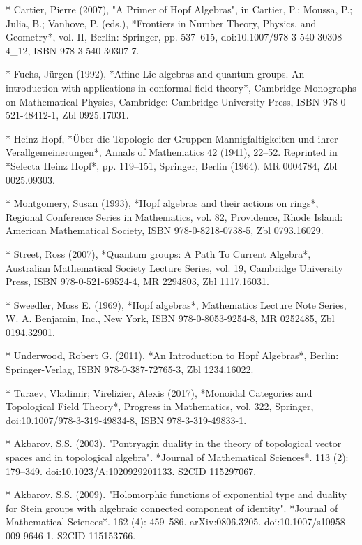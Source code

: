 * Cartier, Pierre (2007), "A Primer of Hopf Algebras", in Cartier, P.; Moussa, P.; Julia, B.; Vanhove, P. (eds.), *Frontiers in Number Theory, Physics, and Geometry*, vol. II, Berlin: Springer, pp. 537–615, doi:10.1007/978-3-540-30308-4\_12, ISBN 978-3-540-30307-7.

* Fuchs, Jürgen (1992), *Affine Lie algebras and quantum groups. An introduction with applications in conformal field theory*, Cambridge Monographs on Mathematical Physics, Cambridge: Cambridge University Press, ISBN 978-0-521-48412-1, Zbl 0925.17031.

* Heinz Hopf, *Über die Topologie der Gruppen-Mannigfaltigkeiten und ihrer Verallgemeinerungen*, Annals of Mathematics 42 (1941), 22–52. Reprinted in *Selecta Heinz Hopf*, pp. 119–151, Springer, Berlin (1964). MR 0004784, Zbl 0025.09303.

* Montgomery, Susan (1993), *Hopf algebras and their actions on rings*, Regional Conference Series in Mathematics, vol. 82, Providence, Rhode Island: American Mathematical Society, ISBN 978-0-8218-0738-5, Zbl 0793.16029.

* Street, Ross (2007), *Quantum groups: A Path To Current Algebra*, Australian Mathematical Society Lecture Series, vol. 19, Cambridge University Press, ISBN 978-0-521-69524-4, MR 2294803, Zbl 1117.16031.

* Sweedler, Moss E. (1969), *Hopf algebras*, Mathematics Lecture Note Series, W. A. Benjamin, Inc., New York, ISBN 978-0-8053-9254-8, MR 0252485, Zbl 0194.32901.

* Underwood, Robert G. (2011), *An Introduction to Hopf Algebras*, Berlin: Springer-Verlag, ISBN 978-0-387-72765-3, Zbl 1234.16022.

* Turaev, Vladimir; Virelizier, Alexis (2017), *Monoidal Categories and Topological Field Theory*, Progress in Mathematics, vol. 322, Springer, doi:10.1007/978-3-319-49834-8, ISBN 978-3-319-49833-1.

* Akbarov, S.S. (2003). "Pontryagin duality in the theory of topological vector spaces and in topological algebra". *Journal of Mathematical Sciences*. 113 (2): 179–349. doi:10.1023/A:1020929201133. S2CID 115297067.

* Akbarov, S.S. (2009). "Holomorphic functions of exponential type and duality for Stein groups with algebraic connected component of identity". *Journal of Mathematical Sciences*. 162 (4): 459–586. arXiv:0806.3205. doi:10.1007/s10958-009-9646-1. S2CID 115153766.
